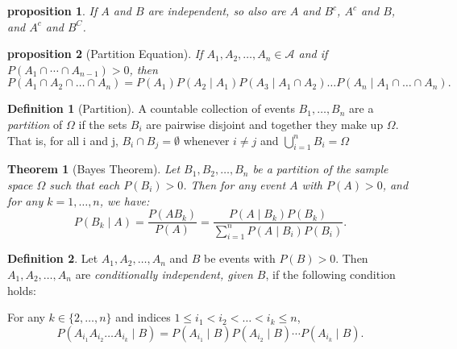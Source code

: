 \documentclass{article}
\newtheorem{theorem}{Theorem}[section]
\newtheorem{proposition}{Proposition}[section]
\newtheorem{proposition}{proposition}[section]
\theoremstyle{definition}
\newtheorem{definition}{Definition}[section]
\theoremstyle{remark}
\begin{document}
\begin{proposition}
If $A$ and $B$ are independent, so also are $A$ and $B^c$, $A^c$ and $B$, and $A^c$ and $B^C$. 
\end{proposition}



\begin{proposition}[Partition Equation]\label{prop:partition equation}
If \(A_1, A_2, \dots, A_n \in \mathcal{A}\) and if $ P(A_1 \cap \cdots \cap A_{n-1}) > 0$, then  
\[
P(A_1 \cap A_2 \cap \dots \cap A_n) = P(A_1)P(A_2 \mid A_1)P(A_3 \mid A_1 \cap A_2) \dots P(A_n \mid A_1 \cap \dots \cap A_n).
\]
\end{proposition}



\begin{definition}[Partition]\label{def:partition}
A countable collection of events \(B_1, \dots, B_n\) are a \textit{partition} of \(\Omega\) 
if the sets \(B_i\) are pairwise disjoint and together they make up \(\Omega\). 
That is, for all i and j, \( B_i \cap B_j = \emptyset \) whenever \(i \neq j\) 
and \( \bigcup_{i=1}^n B_i = \Omega\)
\end{definition}







\begin{theorem}[Bayes Theorem]\label{thm:bayes_formula}
Let \( B_1, B_2, \dots, B_n \) be a partition of the sample space \( \Omega \) such that each \( P(B_i) > 0 \). Then for any event \( A \) with \( P(A) > 0 \), and for any \( k = 1, \dots, n \), we have:
\[
P(B_k \mid A) = \frac{P(A B_k)}{P(A)} = \frac{P(A \mid B_k) P(B_k)}{\sum_{i=1}^{n} P(A \mid B_i) P(B_i)}.
\]
\end{theorem}









\begin{definition}\label{def:conditional_independence}
Let \( A_1, A_2, \dots, A_n \) and \( B \) be events with \( P(B) > 0 \). Then \( A_1, A_2, \dots, A_n \) are \textit{conditionally independent, given \( B \)}, if the following condition holds:

For any \( k \in \{2, \dots, n\} \) and indices \( 1 \leq i_1 < i_2 < \dots < i_k \leq n \),
\[
P(A_{i_1} A_{i_2} \dots A_{i_k} \mid B) = P(A_{i_1} \mid B) P(A_{i_2} \mid B) \cdots P(A_{i_k} \mid B).
\]
\end{definition}
\end{document}
